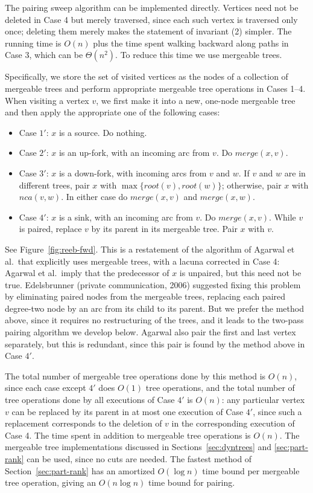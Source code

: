 \documentclass[twoside,leqno,twocolumn]{article}
\begin{document}
The pairing sweep algorithm can be implemented directly.  Vertices need not be deleted in Case 4 but merely traversed, since each such vertex is traversed only once; deleting them merely makes the statement of invariant (2) simpler.  The running time is $O(n)$ plus the time spent walking backward along paths in Case 3, which can be $\Theta(n^2)$.  To reduce this time we use mergeable trees.

Specifically, we store the set of visited vertices as the nodes of a collection of mergeable trees and perform appropriate mergeable tree operations in Cases 1--4.  When visiting a vertex $v$, we first make it into a new, one-node mergeable tree and then apply the appropriate one of the following cases:

\begin{itemize}
\item Case $1'$: $x$ is a source.  Do nothing.
\item Case $2'$: $x$ is an up-fork, with an incoming arc from $v$. Do $\mathit{merge}(x, v)$.
\item Case $3'$: $x$ is a down-fork, with incoming arcs from $v$ and $w$.  If $v$ and $w$ are in different trees, pair $x$ with $\max\{\mathit{root}(v), \mathit{root}(w)\}$; otherwise, pair $x$ with $\mathit{nca}(v, w)$.  In either case do $\mathit{merge}(x, v)$ and $\mathit{merge}(x, w)$.
\item Case $4'$: $x$ is a sink, with an incoming arc from $v$.  Do $\mathit{merge}(x, v)$.  While $v$ is paired, replace $v$ by its parent in its mergeable tree.  Pair $x$ with $v$.
\end{itemize}
See Figure~\ref{fig:reeb-fwd}. This is a restatement of the algorithm of Agarwal et al.\ that explicitly uses mergeable trees, with a lacuna corrected in Case 4: Agarwal et al.\ imply that the predecessor of $x$ is unpaired, but this need not be true.  Edelsbrunner (private communication, 2006) suggested fixing this problem by eliminating paired nodes from the mergeable trees, replacing each paired degree-two node by an arc from its child to its parent.  But we prefer the method above, since it requires no restructuring of the trees, and it leads to the two-pass pairing algorithm we develop below.  Agarwal also pair the first and last vertex separately, but this is redundant, since this pair is found by the method above in Case $4'$.

The total number of mergeable tree operations done by this method is $O(n)$, since each case except $4'$ does $O(1)$ tree operations, and the total number of tree operations done by all executions of Case $4'$ is $O(n)$: any particular vertex $v$ can be replaced by its parent in at most one execution of Case $4'$,  since such a replacement corresponds to the deletion of $v$ in the corresponding execution of Case 4.  The time spent in addition to mergeable tree operations is $O(n)$. The mergeable tree implementations discussed in Sections~\ref{sec:dyntrees} and \ref{sec:part-rank} can be used, since no cuts are needed.  The fastest method of Section~\ref{sec:part-rank} has an amortized $O(\log n)$ time bound per mergeable tree operation, giving an $O(n\log n)$ time bound for pairing.
\end{document}
